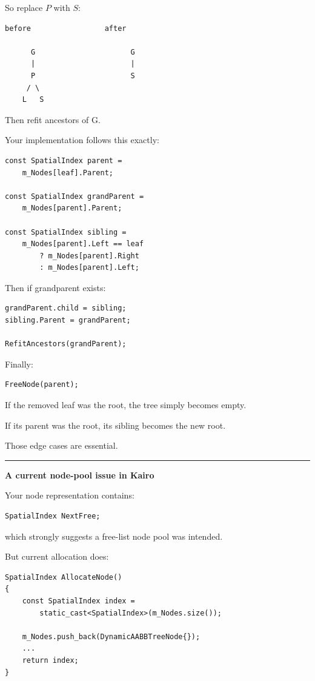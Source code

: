 So replace \(P\) with \(S\):

\begin{verbatim}
before                 after

      G                      G
      |                      |
      P                      S
     / \
    L   S
\end{verbatim}

Then refit ancestors of G.

Your implementation follows this exactly:

\begin{verbatim}
const SpatialIndex parent =
    m_Nodes[leaf].Parent;

const SpatialIndex grandParent =
    m_Nodes[parent].Parent;

const SpatialIndex sibling =
    m_Nodes[parent].Left == leaf
        ? m_Nodes[parent].Right
        : m_Nodes[parent].Left;
\end{verbatim}

Then if grandparent exists:

\begin{verbatim}
grandParent.child = sibling;
sibling.Parent = grandParent;

RefitAncestors(grandParent);
\end{verbatim}

Finally:

\begin{verbatim}
FreeNode(parent);
\end{verbatim}

If the removed leaf was the root, the tree simply becomes empty.

If its parent was the root, its sibling becomes the new root.

Those edge cases are essential.

\begin{center}\rule{0.5\linewidth}{0.5pt}\end{center}

\textbf{A current node-pool issue in Kairo}

Your node representation contains:

\begin{verbatim}
SpatialIndex NextFree;
\end{verbatim}

which strongly suggests a free-list node pool was intended.

But current allocation does:

\begin{verbatim}
SpatialIndex AllocateNode()
{
    const SpatialIndex index =
        static_cast<SpatialIndex>(m_Nodes.size());

    m_Nodes.push_back(DynamicAABBTreeNode{});
    ...
    return index;
}
\end{verbatim}


